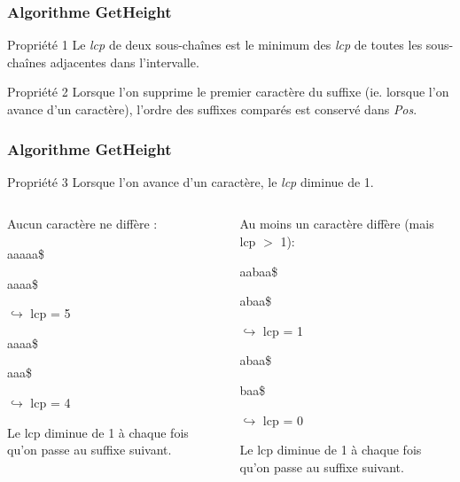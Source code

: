 \documentclass[10pt]{beamer}
\begin{document}
\begin{frame}
  \frametitle{Algorithme GetHeight}

  \begin{block}{Propriété 1}
  Le \textit{lcp} de deux sous-chaînes est le minimum des \textit{lcp} de
  toutes les sous-chaînes adjacentes dans l'intervalle.
  \end{block}
  \begin{block}{Propriété 2}
  Lorsque l'on supprime le premier caractère du suffixe (ie. lorsque l'on
  avance d'un caractère), l'ordre des suffixes comparés est conservé dans
  \textit{Pos}.
  \end{block}
\end{frame}

\begin{frame}

  \frametitle{Algorithme GetHeight}
  
  
  \begin{block}{Propriété 3}
    Lorsque l'on avance d'un caractère, le \textit{lcp} diminue de 1.
  \end{block}
  

  \begin{columns}
    \begin{column}{.48\textwidth}
      
      Aucun caractère ne diffère :
      
      aaaaa\$

      aaaa\$

      $\hookrightarrow$ lcp = 5

      aaaa\$

      aaa\$

      $\hookrightarrow$ lcp = 4

      
      Le lcp diminue de 1 à chaque fois qu'on passe au suffixe suivant.
      
    \end{column}%
    \hfill%
    \begin{column}{.48\textwidth}
        
      Au moins un caractère diffère (mais lcp $>$ 1):
      
        aabaa\$

        abaa\$

        $\hookrightarrow$ lcp = 1

        abaa\$

        baa\$

        $\hookrightarrow$ lcp = 0
        
        Le lcp diminue de 1 à chaque fois qu'on passe au suffixe suivant.
        
      \end{column}%
      \end{columns}
  
\end{frame}
\end{document}
